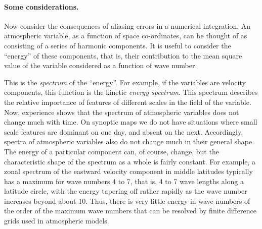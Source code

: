 \paragraph{Some considerations.}
Now consider the consequences of aliasing errors in a numerical integration. An atmospheric variable, as a function of space co-ordinates, can be thought of as consisting of a series of harmonic components. It is useful to consider the “energy” of these components, that is, their contribution to the mean square value of the variable considered as a function of wave number.

This is the \textit{spectrum} of the “energy”. For example, if the variables are velocity components, this function is the kinetic \textit{energy spectrum}. This spectrum describes the relative importance of features of different scales in the field of the variable. Now, experience shows that the spectrum of atmospheric variables does not change much with time. On synoptic maps we do not have situations where small scale features are dominant on one day, and absent on the next. Accordingly, spectra of atmospheric variables also do not change much in their general shape. The energy of a particular component can, of course, change, but the characteristic shape of the spectrum as a whole is fairly constant. For example, a zonal spectrum of the eastward velocity component in middle latitudes typically has a maximum for wave numbers 4 to 7, that is, 4 to 7 wave lengths along a latitude circle, with the energy tapering off rather rapidly as the wave number increases beyond about 10. Thus, there is very little energy in wave numbers of the order of the maximum wave numbers that can be resolved by finite difference grids used in atmospheric models.


